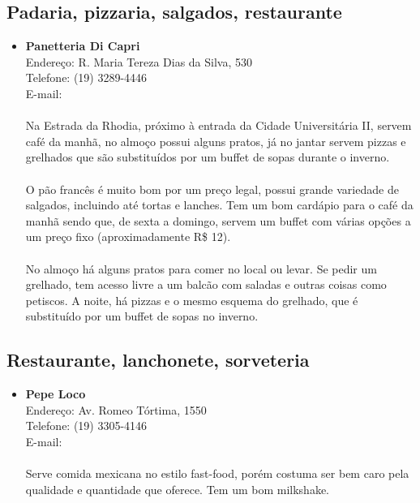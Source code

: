 \subsection{Padaria, pizzaria, salgados, restaurante}

\begin{itemize}
\item \textbf{Panetteria Di Capri}
  \\Endereço: R. Maria Tereza Dias da Silva, 530
  \\Telefone: (19) 3289-4446
  \\E-mail: 
  \\
  \\Na Estrada da Rhodia, próximo à entrada da Cidade Universitária II, servem
  café da manhã, no almoço possui alguns pratos, já no jantar servem pizzas e
  grelhados que são substituídos por um buffet de sopas durante o inverno.
  \\
  \\O pão francês é muito bom por um preço legal, possui grande variedade de
  salgados, incluindo até tortas e lanches. Tem um bom cardápio para o café da
  manhã sendo que, de sexta a domingo, servem um buffet com várias opções a um
  preço fixo (aproximadamente R\$ 12).
  \\
  \\No almoço há alguns pratos para comer no local ou levar. Se pedir um
  grelhado, tem acesso livre a um balcão com saladas e outras coisas como
  petiscos. A noite, há pizzas e o mesmo esquema do grelhado, que é substituído
  por um buffet de sopas no inverno.
\end{itemize}

\subsection{Restaurante, lanchonete, sorveteria}

\begin{itemize}
\item \textbf{Pepe Loco}
  \\Endereço: Av. Romeo Tórtima, 1550
  \\Telefone: (19) 3305-4146
  \\E-mail: 
  \\
  \\Serve comida mexicana no estilo fast-food, porém costuma ser bem caro pela
  qualidade e quantidade que oferece. Tem um bom milkshake.
\end{itemize}

